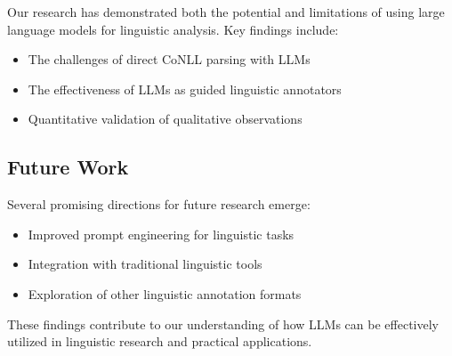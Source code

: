 Our research has demonstrated both the potential and limitations of using large language models for linguistic analysis. Key findings include:

\begin{itemize}
    \item The challenges of direct CoNLL parsing with LLMs
    \item The effectiveness of LLMs as guided linguistic annotators
    \item Quantitative validation of qualitative observations
\end{itemize}

\subsection{Future Work}
Several promising directions for future research emerge:
\begin{itemize}
    \item Improved prompt engineering for linguistic tasks
    \item Integration with traditional linguistic tools
    \item Exploration of other linguistic annotation formats
\end{itemize}

These findings contribute to our understanding of how LLMs can be effectively utilized in linguistic research and practical applications. 